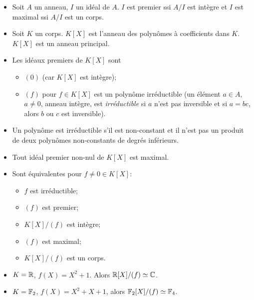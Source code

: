 \begin{itemize}
\item Soit $A$ un anneau, $I$ un idéal de $A$. $I$ est premier ssi $A/I$ est intègre et $I$ est maximal ssi
  $A/I$ est un corps.

\item Soit $K$ un corps. $K[X]$ est l'anneau des polynômes à coefficients dans $K$. $K[X]$ est un anneau
  principal. 

\item Les idéaux premiers de $K[X]$ sont
  \begin{itemize}
  \item $(0)$ (car $K[X]$ est intègre);
  \item $(f)$ pour $f \in K[X]$ est un polynôme irréductible (un élément $a \in A$, $a \neq 0$, anneau intègre, est
    \emph{irréductible} si $a$ n'est pas inversible et si $a = bc$, alors $b$ ou $c$ est inversible).
  \end{itemize}

\item Un polynôme est irréductible s'il est non-constant et il n'est pas un produit de deux polynômes
  non-constants de degrés inférieurs.

\item Tout idéal premier non-nul de $K[X]$ est maximal.

\item Sont équivalentes pour $f \neq 0 \in K[X]$:
  \begin{itemize}
  \item $f$ est irréductible;
  \item $(f)$ est premier;
  \item $K[X]/(f)$ est intègre;
  \item $(f)$ est maximal;
  \item $K[X]/(f)$ est un corps.
  \end{itemize}


\end{itemize}

\begin{exs}
  \begin{itemize}
  \item $K = \mathbb{R}$, $f(X) = X^2 + 1$. Alors $\mathbb{R}[X]/(f) \simeq \mathbb{C}$.
  \item $K = \mathbb{F}_2$, $f(X)= X^2 + X + 1$, alors $\mathbb{F}_2[X]/(f) \simeq \mathbb{F}_4$.
  \end{itemize}
\end{exs}


